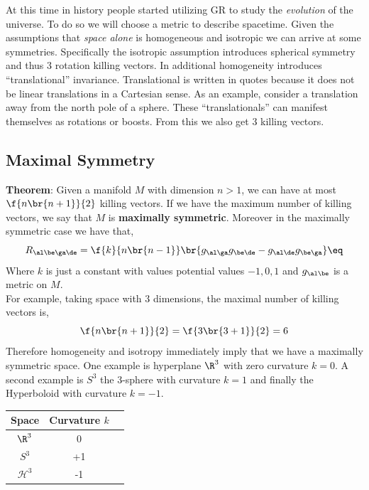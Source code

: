 \documentclass{article}
\begin{document}
At this time in history people started utilizing GR to study the \textit{evolution} of the universe. To do so we will choose a metric to describe spacetime. Given the assumptions that \textit{space alone} is homogeneous and isotropic we can arrive at some symmetries. Specifically the isotropic assumption introduces spherical symmetry and thus $3$ rotation killing vectors. In additional homogeneity introduces ``translational'' invariance. Translational is written in quotes because it does not be linear translations in a Cartesian sense. As an example, consider a translation away from the north pole of a sphere. These ``translationals'' can manifest themselves as rotations or boosts. From this we also get $3$ killing vectors. \\

\subsection{Maximal Symmetry}
\label{sec:maxsym}

\textbf{Theorem}: Given a manifold $M$ with dimension $n > 1$, we can have at most $\f{n\br{n+1}}{2}$ killing vectors. If we have the maximum number of killing vectors, we say that $M$ is \textbf{maximally symmetric}. Moreover in the maximally symmetric case we have that,
\[ R_{\al\be\ga\de} = \f{k}{n\br{n-1}} \br{g_{\al\ga} g_{\be\de} - g_{\al\de} g_{\be\ga}} \eq \label{eq:maxsym}\]
Where $k$ is just a constant with values potential values $-1, 0, 1$ and $g_{\al\be}$ is a metric on $M$.\\

For example, taking space with $3$ dimensions, the maximal number of killing vectors is,
\[ \f{n\br{n+1}}{2} = \f{3\br{3+1}}{2} = 6 \]
Therefore homogeneity and isotropy immediately imply that we have a maximally symmetric space. One example is hyperplane $\R^3$ with zero curvature $k = 0$. A second example is $S^3$ the 3-sphere with curvature $k = 1$ and finally the Hyperboloid with curvature $k=-1$. \\
\begin{center}
\begin{tabular}{|c|c|c|}
    \hline
    Space & Curvature $k$ \\
    \hline
    $\R^3$ & 0 \\
    $S^3$ & +1 \\
    $\mathcal{H}^3$ & -1 \\
    \hline
\end{tabular}
\end{center}
\end{document}
